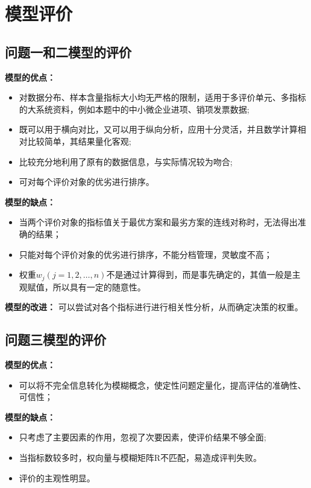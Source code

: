 \documentclass{cumcmthesis}
\begin{document}
\section{模型评价}
\subsection{问题一和二模型的评价}
\textbf{模型的优点：}
\begin{itemize}
	\item 对数据分布、样本含量指标大小均无严格的限制，适用于多评价单元、多指标的大系统资料，例如本题中的中小微企业进项、销项发票数据;
	\item 既可以用于横向对比，又可以用于纵向分析，应用十分灵活，并且数学计算相对比较简单，其结果量化客观;
	\item 比较充分地利用了原有的数据信息，与实际情况较为吻合;
	\item 可对每个评价对象的优劣进行排序。
\end{itemize}

\textbf{模型的缺点：}
\begin{itemize}
	\item 当两个评价对象的指标值关于最优方案和最劣方案的连线对称时，无法得出准确的结果；
	\item 只能对每个评价对象的优劣进行排序，不能分档管理，灵敏度不高；
	\item 权重$w_j(j=1,2,…,n)$不是通过计算得到，而是事先确定的，其值一般是主观赋值，所以具有一定的随意性。
\end{itemize}

\textbf{模型的改进：}
可以尝试对各个指标进行进行相关性分析，从而确定决策的权重。

\subsection{问题三模型的评价}
\textbf{模型的优点：}
\begin{itemize}
	\item 可以将不完全信息转化为模糊概念，使定性问题定量化，提高评估的准确性、可信性；
\end{itemize}

\textbf{模型的缺点：}
\begin{itemize}
	\item 只考虑了主要因素的作用，忽视了次要因素，使评价结果不够全面;
	\item 当指标数较多时，权向量与模糊矩阵R不匹配，易造成评判失败。
	\item 评价的主观性明显。
	
\end{itemize}
\end{document}
